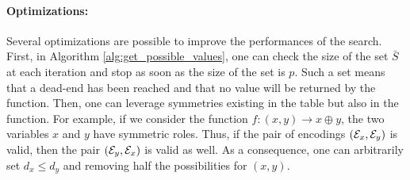 
\paragraph{Optimizations:} Several optimizations are possible to improve the performances of the search. First, in Algorithm \ref{alg:get_possible_values}, one can check the size of the set $\bar S$ at each iteration and stop as soon as the size of the set is $p$. Such a set means that a dead-end has been reached and that no value will be returned by the function. Then, one can leverage symmetries existing in the table but also in the function. For example, if we consider the function $f: (x, y) \longrightarrow x \oplus y$, the two variables $x$ and $y$ have symmetric roles. Thus, if the pair of encodings $(\mathcal{E}_x, \mathcal{E}_y)$ is valid, then the pair $(\mathcal{E}_y, \mathcal{E}_x)$ is valid as well. As a consequence, one can arbitrarily set $d_x \le d_y$ and removing half the possibilities for $(x, y)$.




